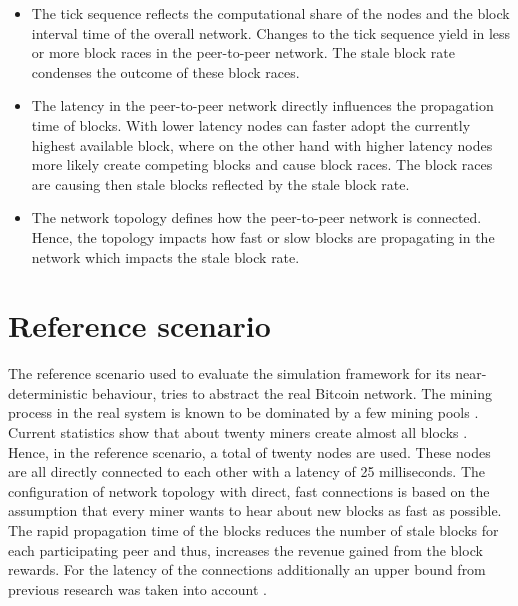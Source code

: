 \begin{itemize}
	\item The tick sequence reflects the computational share of the nodes and the block interval time of the overall network. Changes to the tick sequence yield in less or more block races in the peer-to-peer network.
	The stale block rate condenses the outcome of these block races.
	\item The latency in the peer-to-peer network directly influences the propagation time of blocks.
	With lower latency nodes can faster adopt the currently highest available block, where on the other hand with higher latency nodes more likely create competing blocks and cause block races.
	The block races are causing then stale blocks reflected by the stale block rate.
	\item The network topology defines how the peer-to-peer network is connected.
	Hence, the topology impacts how fast or slow blocks are propagating in the network which impacts the stale block rate.
\end{itemize}

\section{Reference scenario}
\label{chap:reference_scenario}

The reference scenario used to evaluate the simulation framework for its near-deterministic behaviour, tries to abstract the real Bitcoin network.
The mining process in the real system is known to be dominated by a few mining pools \cite{gervais2014bitcoin, beikverdi2015trend, tschorsch2016bitcoin, clarkresearch, gencer2018decentralization}.
Current statistics show that about twenty miners create almost all blocks \cite{gencer2018decentralization, blockchaininfopools, coindanceblocks, bitcointickerpools}.
Hence, in the reference scenario, a total of twenty nodes are used.
These nodes are all directly connected to each other with a latency of 25 milliseconds.
The configuration of network topology with direct, fast connections is based on the assumption that every miner wants to hear about new blocks as fast as possible.
The rapid propagation time of the blocks reduces the number of stale blocks for each participating peer and thus, increases the revenue gained from the block rewards.
For the latency of the connections additionally an upper bound from previous research was taken into account \cite{decker2013information}.

